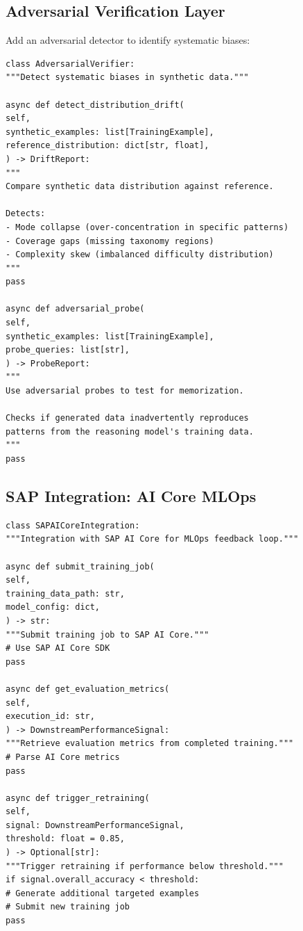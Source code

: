 \documentclass[12pt,a4paper,twoside]{report}
\begin{document}
\subsection{Adversarial Verification Layer}

Add an adversarial detector to identify systematic biases:

\begin{lstlisting}[language=jsonx,caption={Adversarial verification for distribution drift.}]
class AdversarialVerifier:
"""Detect systematic biases in synthetic data."""

async def detect_distribution_drift(
self,
synthetic_examples: list[TrainingExample],
reference_distribution: dict[str, float],
) -> DriftReport:
"""
Compare synthetic data distribution against reference.

Detects:
- Mode collapse (over-concentration in specific patterns)
- Coverage gaps (missing taxonomy regions)
- Complexity skew (imbalanced difficulty distribution)
"""
pass

async def adversarial_probe(
self,
synthetic_examples: list[TrainingExample],
probe_queries: list[str],
) -> ProbeReport:
"""
Use adversarial probes to test for memorization.

Checks if generated data inadvertently reproduces
patterns from the reasoning model's training data.
"""
pass
\end{lstlisting}

\subsection{SAP Integration: AI Core MLOps}

\begin{lstlisting}[language=jsonx,caption={SAP AI Core integration for closed-loop training.}]
class SAPAICoreIntegration:
"""Integration with SAP AI Core for MLOps feedback loop."""

async def submit_training_job(
self,
training_data_path: str,
model_config: dict,
) -> str:
"""Submit training job to SAP AI Core."""
# Use SAP AI Core SDK
pass

async def get_evaluation_metrics(
self,
execution_id: str,
) -> DownstreamPerformanceSignal:
"""Retrieve evaluation metrics from completed training."""
# Parse AI Core metrics
pass

async def trigger_retraining(
self,
signal: DownstreamPerformanceSignal,
threshold: float = 0.85,
) -> Optional[str]:
"""Trigger retraining if performance below threshold."""
if signal.overall_accuracy < threshold:
# Generate additional targeted examples
# Submit new training job
pass
\end{lstlisting}
\end{document}
